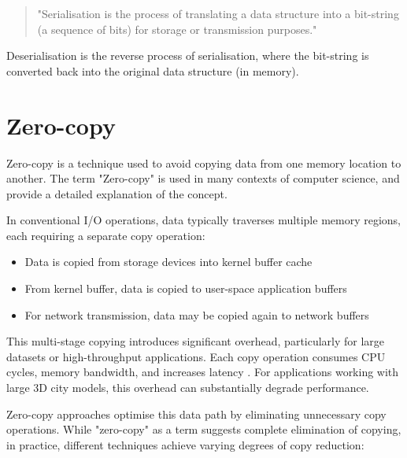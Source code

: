 \begin{quote}
  "Serialisation is the process of translating a data structure into a bit-string (a sequence of bits) for storage or transmission purposes."
\end{quote}

Deserialisation is the reverse process of serialisation, where the bit-string is converted back into the original data structure (in memory).

\section{Zero-copy}
\label{tb:zero_copy}
Zero-copy is a technique used to avoid copying data from one memory location to another. The term "Zero-copy" is used in many contexts of computer science, \citet{song2012performance}  and \citet{brose_2008_zerocopy} provide a detailed explanation of the concept.

In conventional I/O operations, data typically traverses multiple memory regions, each requiring a separate copy operation:

\begin{itemize}
  \item Data is copied from storage devices into kernel buffer cache
  \item From kernel buffer, data is copied to user-space application buffers
  \item For network transmission, data may be copied again to network buffers
\end{itemize}

This multi-stage copying introduces significant overhead, particularly for large datasets or high-throughput applications. Each copy operation consumes CPU cycles, memory bandwidth, and increases latency \citep{song2012performance}. For applications working with large 3D city models, this overhead can substantially degrade performance.

Zero-copy approaches optimise this data path by eliminating unnecessary copy operations. While "zero-copy" as a term suggests complete elimination of copying, in practice, different techniques achieve varying degrees of copy reduction:

